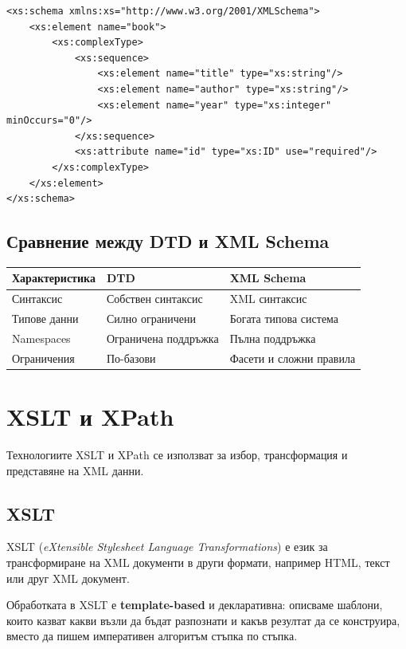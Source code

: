 \documentclass{scrartcl}
\begin{document}
\begin{FlushLeft}
\begin{lstlisting}[caption=XSD example]
<xs:schema xmlns:xs="http://www.w3.org/2001/XMLSchema">
    <xs:element name="book">
        <xs:complexType>
            <xs:sequence>
                <xs:element name="title" type="xs:string"/>
                <xs:element name="author" type="xs:string"/>
                <xs:element name="year" type="xs:integer" minOccurs="0"/>
            </xs:sequence>
            <xs:attribute name="id" type="xs:ID" use="required"/>
        </xs:complexType>
    </xs:element>
</xs:schema>
\end{lstlisting}

\subsection{Сравнение между DTD и XML Schema}

\begin{center}
\begin{tabular}{|l|l|l|}
\hline
\textbf{Характеристика} & \textbf{DTD} & \textbf{XML Schema} \\
\hline
Синтаксис & Собствен синтаксис & XML синтаксис \\
\hline
Типове данни & Силно ограничени & Богата типова система \\
\hline
Namespaces & Ограничена поддръжка & Пълна поддръжка \\
\hline
Ограничения & По-базови & Фасети и сложни правила \\
\hline
\end{tabular}
\end{center}

\section{XSLT и XPath}

Технологиите XSLT и XPath се използват за избор, трансформация и представяне на XML данни.

\subsection{XSLT}

XSLT (\textit{eXtensible Stylesheet Language Transformations}) е език за трансформиране на XML документи в други формати, например HTML, текст или друг XML документ.

Обработката в XSLT е \textbf{template-based} и декларативна: описваме шаблони, които казват какви възли да бъдат разпознати и какъв резултат да се конструира, вместо да пишем императивен алгоритъм стъпка по стъпка.


\end{FlushLeft}
\end{document}
